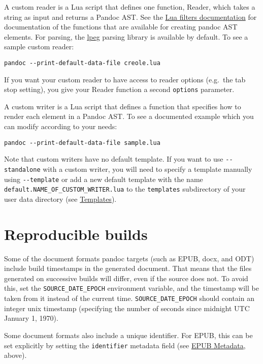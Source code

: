 A custom reader is a Lua script that defines one function, Reader, which
takes a string as input and returns a Pandoc AST. See the
\href{https://pandoc.org/lua-filters.html}{Lua filters documentation}
for documentation of the functions that are available for creating
pandoc AST elements. For parsing, the
\href{http://www.inf.puc-rio.br/~roberto/lpeg/}{lpeg} parsing library is
available by default. To see a sample custom reader:

\begin{verbatim}
pandoc --print-default-data-file creole.lua
\end{verbatim}

If you want your custom reader to have access to reader options
(e.g.~the tab stop setting), you give your Reader function a second
\texttt{options} parameter.

A custom writer is a Lua script that defines a function that specifies
how to render each element in a Pandoc AST. To see a documented example
which you can modify according to your needs:

\begin{verbatim}
pandoc --print-default-data-file sample.lua
\end{verbatim}

Note that custom writers have no default template. If you want to use
\texttt{-\/-standalone} with a custom writer, you will need to specify a
template manually using \texttt{-\/-template} or add a new default
template with the name \texttt{default.NAME\_OF\_CUSTOM\_WRITER.lua} to
the \texttt{templates} subdirectory of your user data directory (see
\protect\hyperlink{templates}{Templates}).

\hypertarget{reproducible-builds}{%
\section{Reproducible builds}\label{reproducible-builds}}

Some of the document formats pandoc targets (such as EPUB, docx, and
ODT) include build timestamps in the generated document. That means that
the files generated on successive builds will differ, even if the source
does not. To avoid this, set the \texttt{SOURCE\_DATE\_EPOCH}
environment variable, and the timestamp will be taken from it instead of
the current time. \texttt{SOURCE\_DATE\_EPOCH} should contain an integer
unix timestamp (specifying the number of seconds since midnight UTC
January 1, 1970).

Some document formats also include a unique identifier. For EPUB, this
can be set explicitly by setting the \texttt{identifier} metadata field
(see \protect\hyperlink{epub-metadata}{EPUB Metadata}, above).

